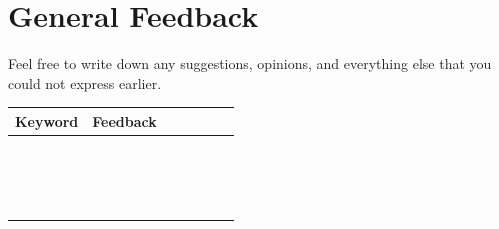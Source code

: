 \documentclass[11pt,a4paper,titlepage,table]{article}
\begin{document}
\newpage

\section{General Feedback}

Feel free to write down any suggestions, opinions, and everything else that you could not express earlier.

\begin{table}[H]
\begin{tabularx}{1.1\textwidth}{|S|X|S|S|S|S|X|}
	\hline Keyword & Feedback \\
  	\hline  & \\
  	\hline  & \\
  	\hline  & \\
  	\hline  & \\
  	\hline  & \\
  	\hline  & \\
  	\hline  & \\
  	\hline  & \\
  	\hline  & \\
  	\hline  & \\
  	\hline  & \\
  	\hline  & \\
  	\hline  & \\
  	\hline  & \\
  	\hline  & \\
  	\hline  & \\
  	\hline
\end{tabularx}
\end{table}
\end{document}
